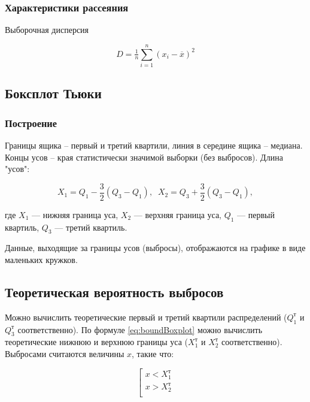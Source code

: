 \subsubsection{Характеристики рассеяния}

Выборочная дисперсия

\begin{equation}
	D = \tfrac{1}{n}\sum\limits_{i=1}^{n} (x_i - \overline{x})^2
\end{equation}

\subsection{Боксплот Тьюки}

\subsubsection{Построение}

Границы ящика -- первый и третий квартили, линия в середине ящика -- медиана. Концы усов -- края статистически значимой выборки (без выбросов). Длина "усов": 

\begin{equation} \label{eq:boundBoxplot}
	X_1 = Q_1 - \dfrac{3}{2}(Q_3 - Q_1), \;\; X_2 = Q_3 + \dfrac{3}{2}(Q_3 - Q_1),
\end{equation}

где $X_1$ --- нижняя граница уса, $X_2$ --- верхняя граница уса, $Q_1$ --- первый квартиль, $Q_3$ --- третий квартиль.

Данные, выходящие за границы усов (выбросы), отображаются на графике в виде маленьких кружков.

\subsection{Теоретическая вероятность выбросов}

Можно вычислить теоретические первый и третий квартили распределений ($Q_1^\text{т}$ и $Q_3^\text{т}$ соответственно). По формуле \eqref{eq:boundBoxplot} можно вычислить теоретические нижнюю и верхнюю границы уса ($X_1^\text{т}$ и $X_2^\text{т}$ соответственно). Выбросами считаются величины $x$, такие что:

\begin{equation}
	\left[ 
	\begin{gathered} 
		x < X_1^\text{т}\\ 
		x > X_2^\text{т}\\ 
	\end{gathered} 
	\right.
\end{equation}


